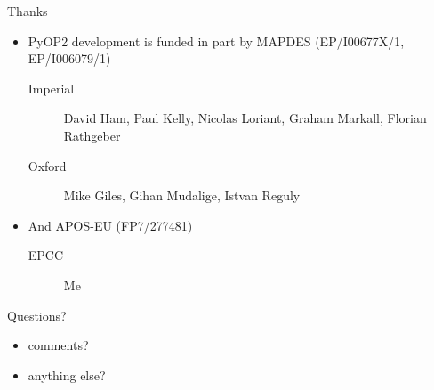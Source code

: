 \documentclass[bigger]{beamer}
\begin{document}
\begin{frame}[label={sec:orgheadline20}]{Thanks}
\begin{itemize}
\item PyOP2 development is funded in part by MAPDES (EP/I00677X/1, EP/I006079/1)
\begin{description}
\item[{Imperial}] David Ham, Paul Kelly, Nicolas
Loriant, Graham Markall, Florian Rathgeber
\item[{Oxford}] Mike Giles, Gihan Mudalige, Istvan Reguly
\end{description}
\item And APOS-EU (FP7/277481)
\begin{description}
\item[{EPCC}] Me
\end{description}
\end{itemize}
\end{frame}

\begin{frame}[label={sec:orgheadline21}]{Questions?}
\begin{itemize}
\item comments?
\item anything else?
\end{itemize}
\end{frame}
\end{document}
